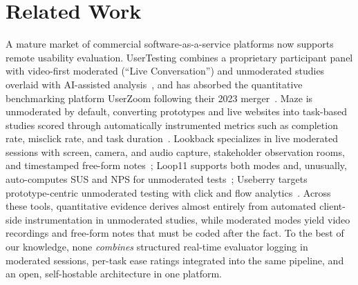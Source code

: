 \section{Related Work}

A mature market of commercial software-as-a-service platforms now supports remote usability evaluation. UserTesting combines a proprietary participant panel with video-first moderated (``Live Conversation'') and unmoderated studies overlaid with AI-assisted analysis~\cite{usertesting2026platform}, and has absorbed the quantitative benchmarking platform UserZoom following their 2023 merger~\cite{usertesting2026userzoom}. Maze is unmoderated by default, converting prototypes and live websites into task-based studies scored through automatically instrumented metrics such as completion rate, misclick rate, and task duration~\cite{maze2026platform}. Lookback specializes in live moderated sessions with screen, camera, and audio capture, stakeholder observation rooms, and timestamped free-form notes~\cite{lookback2026platform}; Loop11 supports both modes and, unusually, auto-computes SUS and NPS for unmoderated tests~\cite{loop112026platform}; Useberry targets prototype-centric unmoderated testing with click and flow analytics~\cite{useberry2026platform}. Across these tools, quantitative evidence derives almost entirely from automated client-side instrumentation in unmoderated studies, while moderated modes yield video recordings and free-form notes that must be coded after the fact. To the best of our knowledge, none \emph{combines} structured real-time evaluator logging in moderated sessions, per-task ease ratings integrated into the same pipeline, and an open, self-hostable architecture in one platform.

